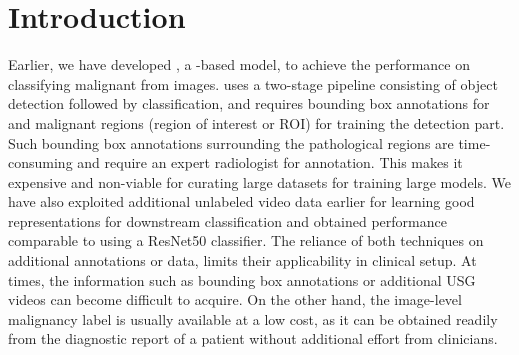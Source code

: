 \section{Introduction}
%

Earlier, we have developed \gbcnet \cite{basu2022surpassing}, a \cnn-based model, to achieve the \sota performance on classifying malignant \gb from \usg images. \gbcnet uses a two-stage pipeline consisting of object detection followed by classification, and requires bounding box annotations for \gb and malignant regions (region of interest or ROI) for training the detection part. Such bounding box annotations surrounding the pathological regions are time-consuming and require an expert radiologist for annotation. This makes it expensive and non-viable for curating large datasets for training large \dnn models. We have also exploited additional unlabeled video data earlier for learning good representations for downstream \gbc classification and obtained performance comparable to \gbcnet using a ResNet50 \cite{resnet} classifier. The reliance of both \sota techniques on additional annotations or data, limits their applicability in clinical setup. At times, the information such as bounding box annotations or additional USG videos can become difficult to acquire. On the other hand, the image-level malignancy label is usually available at a low cost, as it can be obtained readily from the diagnostic report of a patient without additional effort from clinicians. 

